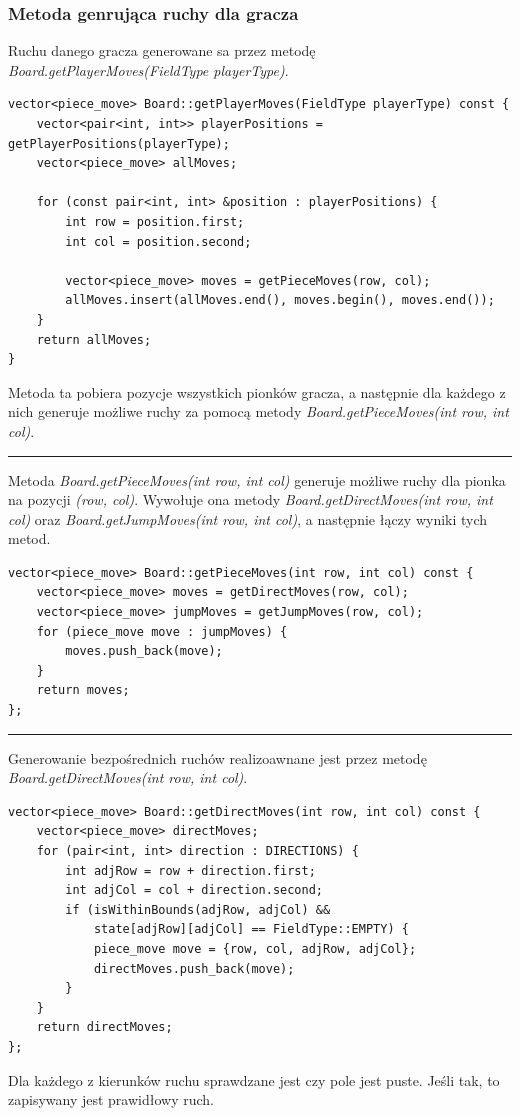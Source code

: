 \documentclass[a4paper, 12pt]{article}
\begin{document}
\subsubsection{Metoda genrująca ruchy dla gracza}
Ruchu danego gracza generowane sa przez metodę 
\textit{Board.getPlayerMoves(FieldType playerType)}.
\begin{lstlisting}
vector<piece_move> Board::getPlayerMoves(FieldType playerType) const {
    vector<pair<int, int>> playerPositions = getPlayerPositions(playerType);
    vector<piece_move> allMoves;

    for (const pair<int, int> &position : playerPositions) {
        int row = position.first;
        int col = position.second;

        vector<piece_move> moves = getPieceMoves(row, col);
        allMoves.insert(allMoves.end(), moves.begin(), moves.end());
    }
    return allMoves;
}
\end{lstlisting}
Metoda ta pobiera pozycje wszystkich pionków gracza, 
a następnie dla każdego z nich generuje możliwe ruchy
za pomocą metody \textit{Board.getPieceMoves(int row, int col)}.
\vspace{0.5cm}
\hrule
\vspace{1cm}

Metoda \textit{Board.getPieceMoves(int row, int col)} 
generuje możliwe ruchy dla pionka na pozycji \textit{(row, col)}.
Wywołuje ona metody \textit{Board.getDirectMoves(int row, int col)} oraz
\textit{Board.getJumpMoves(int row, int col)}, a następnie 
łączy wyniki tych metod.
\begin{lstlisting}
vector<piece_move> Board::getPieceMoves(int row, int col) const {
    vector<piece_move> moves = getDirectMoves(row, col);
    vector<piece_move> jumpMoves = getJumpMoves(row, col);
    for (piece_move move : jumpMoves) {
        moves.push_back(move);
    }
    return moves;
};
\end{lstlisting}
\vspace{0.5cm}
\hrule
\vspace{1cm}

Generowanie bezpośrednich ruchów realizoawnane jest przez metodę
\textit{Board.getDirectMoves(int row, int col)}.
\begin{lstlisting}
vector<piece_move> Board::getDirectMoves(int row, int col) const {
    vector<piece_move> directMoves;
    for (pair<int, int> direction : DIRECTIONS) {
        int adjRow = row + direction.first;
        int adjCol = col + direction.second;
        if (isWithinBounds(adjRow, adjCol) &&
            state[adjRow][adjCol] == FieldType::EMPTY) {
            piece_move move = {row, col, adjRow, adjCol};
            directMoves.push_back(move);
        }
    }
    return directMoves;
};
\end{lstlisting}
Dla każdego z kierunków ruchu sprawdzane jest czy pole jest puste.
Jeśli tak, to zapisywany jest prawidłowy ruch.
\end{document}
